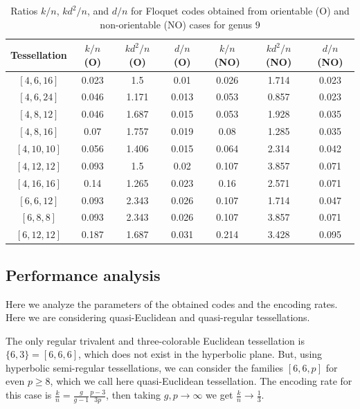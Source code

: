 \documentclass[%
reprint,
amsmath,amssymb,
aps,
]{revtex4-2}
\begin{document}
\begin{table}
	\caption{		\label{tab12}
		Ratios $k/n$, $kd^2/n$, and $d/n$ for Floquet codes obtained from orientable (O) and non-orientable (NO) cases for genus $9$}
	\begin{ruledtabular}
\begin{tabular}{| c | c | c | c |c|c|c|}
	Tessellation & $k/n$ (O) & $kd^2/n $ (O) & $ d/n $ (O)& $k/n$ (NO) & $kd^2/n $ (NO) & $ d/n $ (NO) \\ \hline
			$[4 , 6 , 16 ]$ & 0.023 &	1.5 &	0.01  	& 0.026 &	1.714 &	0.023 \\
			$[4,	6,	24]$ & 0.046 &	1.171 &	0.013  & 0.053 &	0.857 &	0.023 \\
			$[4,	8,	12]$ & 0.046 &	1.687 &	0.015  &   0.053 &	1.928 &	0.035 \\
			$[4,	8,	16]$ & 0.07 &	1.757 &	0.019  &  0.08 &	1.285 &	0.035 \\
			$[4 , 10 , 10 ]$ & 0.056 & 1.406 & 0.015 &  0.064 &	2.314 &	0.042\\
			$[4,	12,	12]$ & 0.093 &	1.5 &	0.02  &  0.107 &	3.857 &	0.071 \\
			$[4,	16,	16]$ &  0.14 &	1.265 &	0.023 &  0.16 &	2.571 &	0.071 \\
			$[6,	6,	12]$ & 0.093 &	2.343 &	0.026	&  0.107 &	1.714 &	0.047 \\
			$[6,	8,	8]$ & 0.093 &	2.343 &	0.026  &  0.107 &	3.857 &	0.071 \\
			$[6,	12,	12]$ & 0.187 &	1.687 &	0.031  &  0.214 &	3.428 &	0.095 \\
			\hline
							\end{tabular}
	\end{ruledtabular}
\end{table}
	
	\subsection{Performance analysis}\label{subPA}
	
	
	Here we analyze the parameters of the obtained codes and the encoding rates. Here we are considering quasi-Euclidean and quasi-regular tessellations.
	
	The only regular trivalent and three-colorable Euclidean tessellation is $\{6,3\} = [6,6,6]$, which does not exist in the hyperbolic plane. But, using hyperbolic semi-regular tessellations, we can consider the families $[6,6,p]$ for even $p \geq 8$, which we call here quasi-Euclidean tessellation. The encoding rate for this case is $\frac{k}{n} = \frac{g}{g-1} \frac{p - 3}{3 p}$, then taking $g, p \rightarrow \infty$ we get $\frac{k}{n} \rightarrow \frac{1}{3}$.
	
\end{document}
